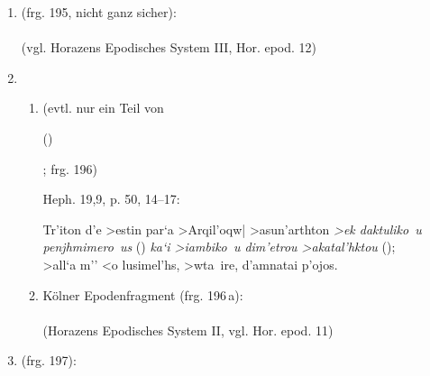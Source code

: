 \documentclass[11pt]{article}
\begin{document}
\begin{enumerate}
\begin{enumerate}
\item {}   (frg. 195, nicht ganz sicher):
  \\\metra{\m\mbb\m\mbb\m\mbb\m\mbb\m\mbb\m\a} 
\metra{\m\mbb\m\mbb\m\bb\m\m} \\(vgl. Horazens Epodisches System III,
Hor. epod. 12)
\item
\begin{enumerate}
\item {} (evtl. nur ein Teil von
  \addtocounter{enumiii}{1}()\addtocounter{enumiii}{-1};
  frg. 196)\par Heph. 19,9, p. 50, 14--17:\par \textgreek{{\small Tr'iton d'e
      >estin par`a >Arqil'oqw| >asun'arthton \textit{>ek daktuliko~u
        penj\-hmi\-me\-ro~us} (\metra{\m\bb\m\bb\m}) \textit{ka`i
        >iambiko~u dim'etrou >akatal'hktou} 
(\metra{\a\m\b\m\s\a\m\b\m});}\\
    >all`a m'' <o lusimel'hs, >wta~ire, d'amnatai p'ojos.}

\item K\"olner Epodenfragment (frg. 196\,a): \\
\metra{\a\m\b\m\s\a\m\b\m\s\a\m\b\m\cc\m\bb\m\bb\m\cc\a\m\b\m\s\a\m\b\m}\\
(Horazens Epodisches System II, vgl. Hor. epod. 11)

\end{enumerate}
\item {} (frg. 197):
\metra{\m\b\m\a\s\m\b\m\a\s\m\b\m}

\end{enumerate}
\end{enumerate}
\end{document}
